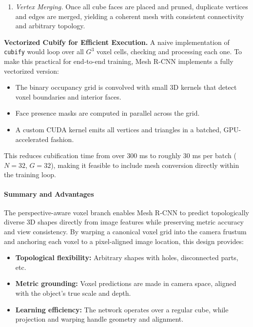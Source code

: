 \begin{enumerate}[label=\textbf{Step \arabic*:}, leftmargin=1.8em, resume]
\begin{enumerate}[label*=\alph*., leftmargin=1.2em]
        \item \emph{Vertex Merging.}  
        Once all cube faces are placed and pruned, duplicate vertices and edges are merged, yielding a coherent mesh with consistent connectivity and arbitrary topology.
    \end{enumerate}
    
    \textbf{Vectorized Cubify for Efficient Execution.}  
    A naive implementation of \texttt{cubify} would loop over all \( G^3 \) voxel cells, checking and processing each one. To make this practical for end-to-end training, Mesh R-CNN implements a fully vectorized version:
    \begin{itemize}
        \item The binary occupancy grid is convolved with small 3D kernels that detect voxel boundaries and interior faces.
        \item Face presence masks are computed in parallel across the grid.
        \item A custom CUDA kernel emits all vertices and triangles in a batched, GPU-accelerated fashion.
    \end{itemize}
    This reduces cubification time from over 300 ms to roughly 30 ms per batch (\( N = 32 \), \( G = 32 \)), making it feasible to include mesh conversion directly within the training loop.
    
\end{enumerate}

\paragraph{Summary and Advantages}

The perspective-aware voxel branch enables Mesh R-CNN to predict topologically diverse 3D shapes directly from image features while preserving metric accuracy and view consistency. By warping a canonical voxel grid into the camera frustum and anchoring each voxel to a pixel-aligned image location, this design provides:

\begin{itemize}
    \item \textbf{Topological flexibility:} Arbitrary shapes with holes, disconnected parts, etc.
    \item \textbf{Metric grounding:} Voxel predictions are made in camera space, aligned with the object's true scale and depth.
    \item \textbf{Learning efficiency:} The network operates over a regular cube, while projection and warping handle geometry and alignment.
\end{itemize}


